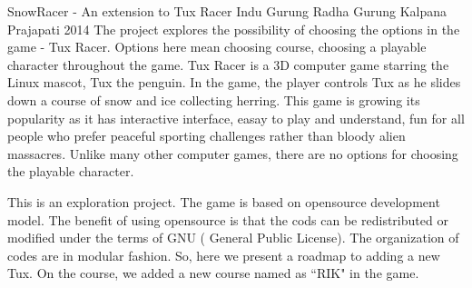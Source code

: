  \begin{conf-abstract}[]
{SnowRacer - An extension to Tux Racer}
{
Indu Gurung
Radha Gurung
Kalpana Prajapati
}
{2014}
The project explores the possibility of choosing the options in the game - Tux Racer. Options here mean choosing course, choosing a playable character throughout the game. Tux Racer is a 3D computer game starring the Linux mascot, Tux the penguin. In the game, the player controls Tux as he slides down a course of snow and ice collecting herring. This game is growing its popularity as it has interactive interface, easay to play and understand, fun for all people who prefer peaceful sporting challenges rather than bloody alien massacres. Unlike many other computer games, there are no options for choosing the playable character.

This is an exploration project. The game is based on opensource development model. The benefit of using opensource is that the cods can be redistributed or modified under the terms of GNU ( General Public License). The organization of codes are in modular fashion. So, here we present a roadmap to adding a new Tux. On the course, we added a new course named as ``RIK" in the game.
  \end{conf-abstract}